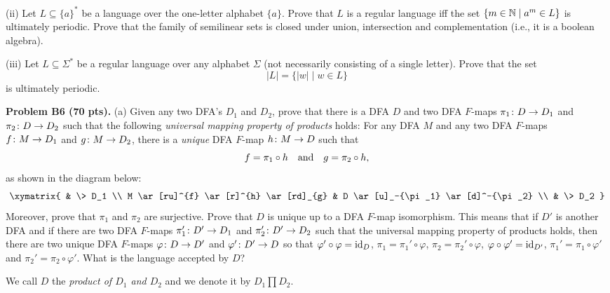 \documentclass[12pt]{article}
\begin{document}
\medskip
(ii)
Let $L\subseteq \{a\}^*$ be a language over the one-letter
alphabet $\{a\}$. Prove that $L$ is a regular language
iff the set
$\{m \in \mathbb{N} \mid a^m\in L\}$ is ultimately
periodic.
Prove that the family of semilinear sets is closed
under union, intersection and complementation
(i.e., it is a boolean algebra).

\medskip
(iii)
Let $L \subseteq \Sigma^*$ be a regular language over
any alphabet $\Sigma$ (not necessarily
consisting of a single letter).
Prove that the set
\[|L| = \{|w| \mid w \in L\}\]
is ultimately periodic. 


\vspace {0.25cm}\noindent
{\bf Problem B6 (70 pts).} 
(a)
Given any two DFA's $D_1$ and $D_2$, prove that there is a DFA
$D$ and two  DFA $F$-maps $\pi_1\colon D\rightarrow D_1$
and $\pi_2\colon D\rightarrow D_2$ such that
the following {\it universal mapping property of products\/} holds:
For any DFA $M$ and any two DFA $F$-maps \\
$f\colon M\rightarrow D_1$ and $g\colon M\rightarrow D_2$, there is
a {\it unique\/} DFA $F$-map $h\colon M\rightarrow D$ such that
\[f = \pi_1\circ h
\quad\hbox{and}\quad 
g = \pi_2\circ h,\]
as shown in the diagram below:
\[
\xymatrix{
  &   \> D_1 \\
M     \ar[ru]^{f} \ar[r]^{h} \ar[rd]_{g} & 
  D   \ar[u]_-{\pi_1}    \ar[d]^-{\pi_2}      \\
  &  \> D_2 
}
\]
Moreover, prove that $\pi_1$ and $\pi_2$ are surjective.
Prove that $D$ is unique up to a DFA $F$-map isomorphism.
This means that if $D'$ is another DFA and if there are two
DFA $F$-maps $\pi_1'\colon D'\rightarrow D_1$
and $\pi_2'\colon D'\rightarrow D_2$ such that
the universal mapping property of products holds, then
there are two unique DFA $F$-maps $\varphi\colon D\rightarrow D'$ and
$\varphi'\colon D'\rightarrow D$ so that
$\varphi'\circ \varphi = {\rm id}_{D}$,
$\pi_1 = \pi_1'\circ  \varphi$, $\pi_2 =  \pi_2'\circ \varphi$,
$\varphi\circ \varphi' = {\rm id}_{D'}$,
$\pi_1' = \pi_1\circ  \varphi'$ and $\pi_2' =  \pi_2\circ \varphi'$.
What is the language accepted by $D$?

\remark
We call $D$ the {\it product of $D_1$ and $D_2$\/}
and we denote it by $D_1\prod D_2$.
\end{document}

